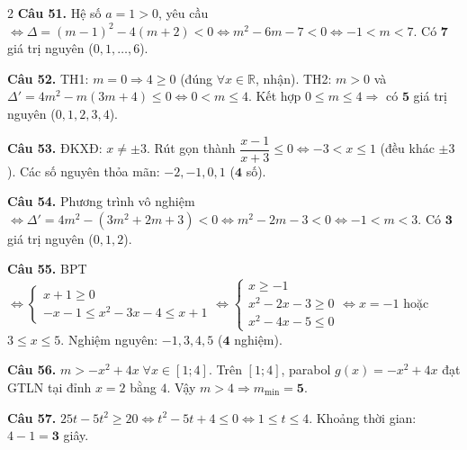 \documentclass[12pt,a4paper]{article}
\begin{document}
\begin{multicols}{2}
\textbf{Câu 51.} Hệ số $a = 1 > 0$, yêu cầu $\Leftrightarrow \Delta = (m - 1)^2 - 4(m + 2) < 0 \Leftrightarrow m^2 - 6m - 7 < 0 \Leftrightarrow -1 < m < 7$. Có $\mathbf{7}$ giá trị nguyên ($0, 1, \dots, 6$).\par\vspace{3pt}

\textbf{Câu 52.} TH1: $m = 0 \Rightarrow 4 \ge 0$ (đúng $\forall x \in \mathbb{R}$, nhận). TH2: $m > 0$ và $\Delta' = 4m^2 - m(3m + 4) \le 0 \Leftrightarrow 0 < m \le 4$. Kết hợp $0 \le m \le 4 \Rightarrow$ có $\mathbf{5}$ giá trị nguyên ($0, 1, 2, 3, 4$).\par\vspace{3pt}

\textbf{Câu 53.} ĐKXĐ: $x \ne \pm 3$. Rút gọn thành $\dfrac{x - 1}{x + 3} \le 0 \Leftrightarrow -3 < x \le 1$ (đều khác $\pm 3$). Các số nguyên thỏa mãn: $-2, -1, 0, 1$ ($\mathbf{4}$ số).\par\vspace{3pt}

\textbf{Câu 54.} Phương trình vô nghiệm $\Leftrightarrow \Delta' = 4m^2 - (3m^2 + 2m + 3) < 0 \Leftrightarrow m^2 - 2m - 3 < 0 \Leftrightarrow -1 < m < 3$. Có $\mathbf{3}$ giá trị nguyên ($0, 1, 2$).\par\vspace{3pt}

\textbf{Câu 55.} BPT $\Leftrightarrow \begin{cases} x + 1 \ge 0 \\ -x - 1 \le x^2 - 3x - 4 \le x + 1 \end{cases} \Leftrightarrow \begin{cases} x \ge -1 \\ x^2 - 2x - 3 \ge 0 \\ x^2 - 4x - 5 \le 0 \end{cases} \Leftrightarrow x = -1$ hoặc $3 \le x \le 5$. Nghiệm nguyên: $-1, 3, 4, 5$ ($\mathbf{4}$ nghiệm).\par\vspace{3pt}

\textbf{Câu 56.} $m > -x^2 + 4x\;\forall x \in [1; 4]$. Trên $[1; 4]$, parabol $g(x) = -x^2 + 4x$ đạt GTLN tại đỉnh $x = 2$ bằng $4$. Vậy $m > 4 \Rightarrow m_{\min} = \mathbf{5}$.\par\vspace{3pt}

\textbf{Câu 57.} $25t - 5t^2 \ge 20 \Leftrightarrow t^2 - 5t + 4 \le 0 \Leftrightarrow 1 \le t \le 4$. Khoảng thời gian: $4 - 1 = \mathbf{3}$ giây.\par\vspace{3pt}


\end{multicols}
\end{document}
